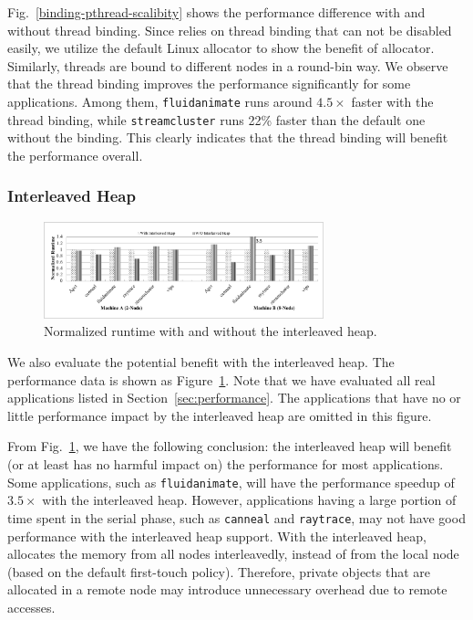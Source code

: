 Fig.~\ref{binding-pthread-scalibity} shows the performance difference with and without thread binding. Since \NM{} relies on thread binding that can not be disabled easily, we utilize the default Linux allocator to show the benefit of allocator. Similarly,  threads are bound to different nodes in a round-bin way. We observe that the thread binding improves the performance significantly for some applications. Among them, \texttt{fluidanimate} runs around $4.5\times$ faster with the thread binding, while \texttt{streamcluster} runs 22\% faster than the default one without the binding. This clearly indicates that the thread binding will benefit the performance overall. 



\subsubsection{Interleaved Heap} 
\label{sec:interleavedheap}

\begin{figure}[!h]
    \centering
    \includegraphics[width=3.2in]{figure/interleavedheap.pdf}
    \caption{Normalized runtime with  and without the interleaved heap.\label{fig:interleavedheap}}  
\end{figure}

We also evaluate the potential benefit with the  interleaved heap. The performance data is shown as Figure~\ref{fig:interleavedheap}. Note that we have evaluated all real applications listed in Section~\ref{sec:performance}. The applications that have no or little performance impact by the interleaved heap are omitted in this figure. 

From Fig.~\ref{fig:interleavedheap}, we have the following conclusion: the interleaved heap will benefit (or at least has no harmful impact on) the performance for most applications. Some applications, such as \texttt{fluidanimate}, will have the performance speedup of $3.5\times$ with the interleaved heap. However, applications having a large portion of time spent in the serial phase, such as \texttt{canneal} and \texttt{raytrace}, may not have good performance with the interleaved heap support. With the interleaved heap, \NM{} allocates the memory from all nodes interleavedly, instead of from the local node (based on the default first-touch policy). Therefore, private objects that are allocated in a remote node may introduce unnecessary overhead due to remote accesses.
 
